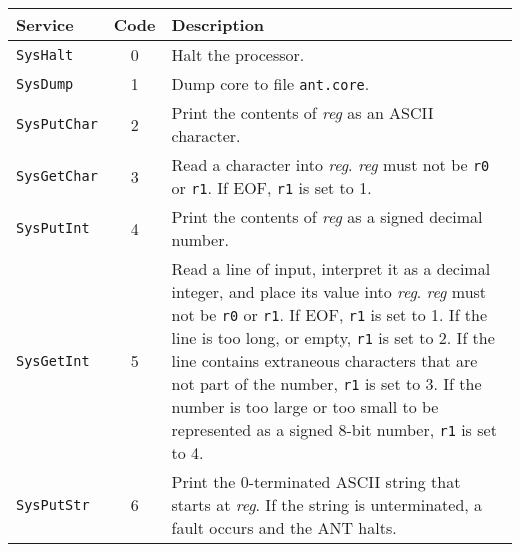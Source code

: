 
\vspace{3mm}
\noindent
\begin{tabular}{|l|c|p{4.75in}|}
\hline
{\bf Service}   & {\bf Code}    & {\bf Description} \\
\hline
\hline
{\tt SysHalt}		& 0     & Halt the processor.   \\
{\tt SysDump}		& 1     & Dump core to file {\tt ant.core}.   \\
\hline
{\tt SysPutChar}	& 2     & Print the contents of {\em reg} as an
                                        ASCII character.  \\
{\tt SysGetChar}	& 3     &
                                Read a character into {\em reg}.  {\em reg}
                                must not be {\tt r0} or {\tt r1}.  If
                                EOF, {\tt r1} is set to 1. \\
\hline
{\tt SysPutInt}		& 4     & Print the contents of {\em reg} as a signed
				decimal number.
                                        \\
{\tt SysGetInt}		& 5     &
                                Read a line of input, interpret it as a
				decimal integer, and place its value
				into {\em reg}.  {\em reg}
                                must not be {\tt r0} or {\tt r1}.  If
                                EOF, {\tt r1} is set to 1.  If the line
				is too long, or empty, {\tt r1} is set to 2.
				If the line contains extraneous characters
				that are not part of the number, {\tt r1}
				is set to 3.  If the number is too large
				or too small to be represented as a signed
				8-bit number, {\tt r1} is set to 4. \\
\hline
{\tt SysPutStr}		& 6     & Print the 0-terminated {\sc ASCII}
				string that starts at {\em reg}.
				If the string is unterminated, a fault
				occurs and the ANT halts.
                                        \\
\hline
\end{tabular}

